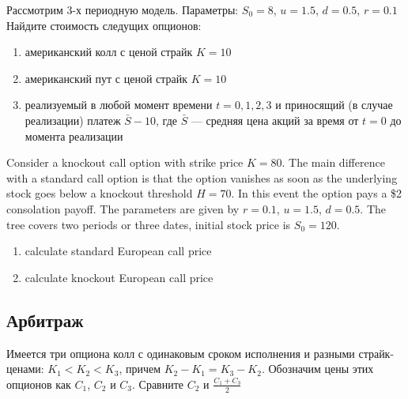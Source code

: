 \begin{problem}
Рассмотрим 3-х периодную модель. Параметры: $S_{0}=8$, $u=1.5$, $d=0.5$, $r=0.1$ \\
Найдите стоимость следущих опционов: \\
\begin{enumerate}
\item американский колл с ценой страйк $K=10$
\item американский пут с ценой страйк $K=10$
\item реализуемый в любой момент времени $t=0,1,2,3$ и приносящий (в случае реализации) платеж $\bar{S}-10$, где $\bar{S}$ — средняя цена акций за время от $t=0$ до момента реализации
\end{enumerate}

\begin{sol}

\end{sol}
\end{problem}

\begin{problem}
 Consider a knockout call option with strike price $K=80$. The main difference with a standard call option is that the option vanishes as soon as the underlying stock goes below a knockout threshold $H=70$. In this event the option pays a \$2 consolation payoff. The parameters are given by $r=0.1$, $u=1.5$, $d=0.5$. The tree covers two periods or three dates, initial stock price is $S_{0}=120$. \\
\begin{enumerate}
\item calculate standard European call price \\
\item calculate knockout European call price
\end{enumerate}

\begin{sol}
\end{sol}
\end{problem}



\subsection{Арбитраж}

\begin{problem}
Имеется три опциона колл с одинаковым сроком исполнения и разными страйк-ценами: $K_{1}<K_{2}<K_{3}$, причем $K_{2}-K_{1}=K_{3}-K_{2}$. Обозначим цены этих опционов как $C_{1}$, $C_{2}$ и $C_{3}$. Сравните $C_{2}$ и $\frac{C_{1}+C_{3}}{2}$

\begin{sol}

\end{sol}
\end{problem}

